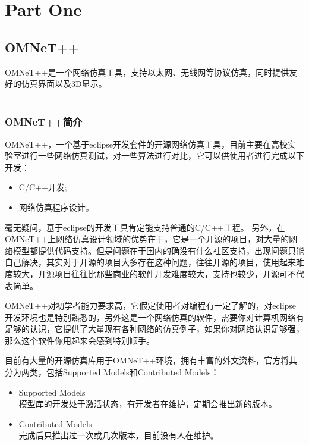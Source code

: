 \part{Part One}
\chapter{OMNeT++}

\begin{summary}
OMNeT++是一个网络仿真工具，支持以太网、无线网等协议仿真，同时提供友好的仿真界面以及3D显示。\\ \\
\end{summary}

\section{OMNeT++简介}

OMNeT++，一个基于eclipse开发套件的开源网络仿真工具，目前主要在高校实验室进行一些网络仿真测试，对一些算法进行对比，它可以供使用者进行完成以下开发：
\begin{itemize}
\item C/C++开发;
\item 网络仿真程序设计。
\end{itemize}

毫无疑问，基于eclipse的开发工具肯定能支持普通的C/C++工程。
另外，在OMNeT++上网络仿真设计领域的优势在于，它是一个开源的项目，对大量的网络模型都提供代码支持。但是问题在于国内的确没有什么社区支持，出现问题只能自己解决，其实对于开源的项目大多存在这种问题，往往开源的项目，使用起来难度较大，开源项目往往比那些商业的软件开发难度较大，支持也较少，开源可不代表简单。

OMNeT++对初学者能力要求高，它假定使用者对编程有一定了解的，对eclipse开发环境也是特别熟悉的，另外这是一个网络仿真的软件，需要你对计算机网络有足够的认识，它提供了大量现有各种网络的仿真例子，如果你对网络认识足够强，那么这个软件你用起来会感到特别顺手。

目前有大量的开源仿真库用于OMNeT++环境，拥有丰富的外文资料，官方将其分为两类，包括Supported Models和Contributed Models：
\begin{itemize}
	\item Supported Models \\
	模型库的开发处于激活状态，有开发者在维护，定期会推出新的版本。
	\item Contributed Models \\
	完成后只推出过一次或几次版本，目前没有人在维护。\\ \\
\end{itemize}


